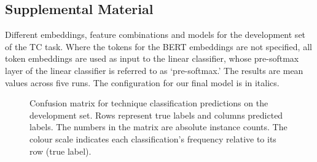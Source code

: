 \documentclass[11pt]{article}
\begin{document}
\begin{appendices}

\section{Supplemental Material}
\label{sec:supplemental}




\begin{table}[h]
    \centering
    
    \caption{Different embeddings, feature combinations and models for the development set of the TC task.
    Where the tokens for the BERT embeddings are not specified, all token embeddings are used as input to the linear classifier, whose pre-softmax layer of the linear classifier is referred to as
    `pre-softmax.'
    The results are mean values across five runs.
    The configuration for our final model is in italics.}
    \label{tab:task2-ablation}
\end{table}

\begin{figure}[h]
  \centering
    
  \caption{
  Confusion matrix for technique classification predictions on the development set.
  Rows represent true labels and columns predicted labels.
  The numbers in the matrix are absolute instance counts.
  The colour scale indicates each classification's frequency relative to its row (true label).
  }
   \label{fig:task2-confusion-matrix}
\end{figure}
\end{appendices}
\end{document}

